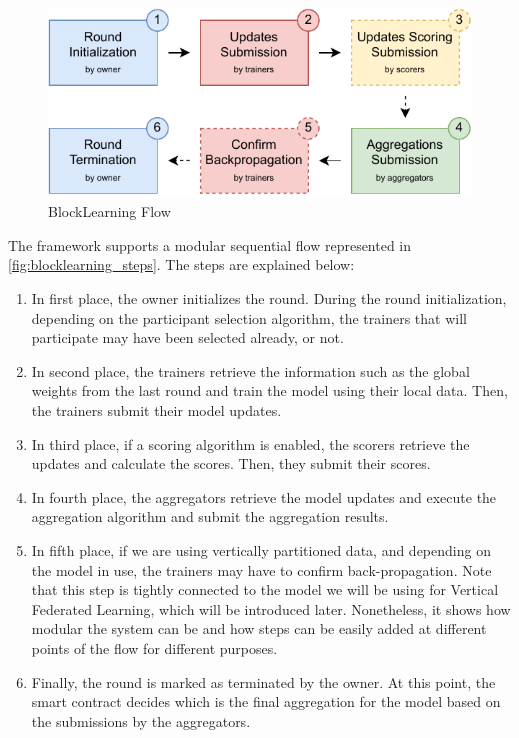 
\begin{figure}[!ht]
    \centering
    \includegraphics[width=1\textwidth]{graphics/sequence.pdf}
    \caption{BlockLearning Flow}
    \label{fig:blocklearning_steps}
\end{figure}

The framework supports a modular sequential flow represented in \autoref{fig:blocklearning_steps}. The steps are explained below:

\begin{enumerate}
    \item In first place, the owner initializes the round. During the round initialization, depending on the participant selection algorithm, the trainers that will participate may have been selected already, or not.
    
    \item In second place, the trainers retrieve the information such as the global weights from the last round and train the model using their local data. Then, the trainers submit their model updates.
    
    \item In third place, if a scoring algorithm is enabled, the scorers retrieve the updates and calculate the scores. Then, they submit their scores.
    
    \item In fourth place, the aggregators retrieve the model updates and execute the aggregation algorithm and submit the aggregation results.
    
    \item In fifth place, if we are using vertically partitioned data, and depending on the model in use, the trainers may have to confirm back-propagation. Note that this step is tightly connected to the model we will be using for Vertical Federated Learning, which will be introduced later. Nonetheless, it shows how modular the system can be and how steps can be easily added at different points of the flow for different purposes.
    
    \item Finally, the round is marked as terminated by the owner. At this point, the smart contract decides which is the final aggregation for the model based on the submissions by the aggregators.
\end{enumerate}

